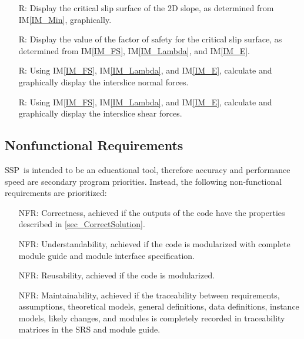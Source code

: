 \documentclass[12pt]{article}
\newcommand{\progname}{SSP}
\newcommand{\iref}[1]{IM\ref{#1}}
\newcounter{reqnum} %
\newcounter{nfreqnum} %
\begin{document}
\begin{itemize}
\item[R\refstepcounter{reqnum}\thereqnum \label{R_CritGraph}:] Display
  the critical slip surface of the 2D slope, as determined from \iref{IM_Min}, 
  graphically. 
  
\item[R\refstepcounter{reqnum}\thereqnum \label{R_OutputFS}:] Display the value 
of the factor of safety for the critical slip surface, as determined from 
\iref{IM_FS}, \iref{IM_Lambda}, and \iref{IM_E}.

\item[R\refstepcounter{reqnum}\thereqnum \label{R_NormalGraph}:] Using 
\iref{IM_FS}, \iref{IM_Lambda}, and \iref{IM_E}, calculate and 
graphically display the interslice normal forces.

\item[R\refstepcounter{reqnum}\thereqnum \label{R_ShearGraph}:] Using 
\iref{IM_FS}, \iref{IM_Lambda}, and \iref{IM_E}, calculate and 
graphically display the interslice shear forces.
  
\end{itemize}


\subsection{Nonfunctional Requirements}

\progname\ is intended to be an educational tool, therefore accuracy and
performance speed are secondary program priorities. Instead, the following 
non-functional requirements are prioritized:

\begin{itemize}
\item[NFR\refstepcounter{nfreqnum}\thenfreqnum \label{NFR_Correctness}:] 
Correctness, achieved if the outputs of the code have the properties described 
in \ref{sec_CorrectSolution}.
\item[NFR\refstepcounter{nfreqnum}\thenfreqnum \label{NFR_Understandability}:] 
Understandability, achieved if the code is modularized with 
complete module guide and module interface specification.
\item[NFR\refstepcounter{nfreqnum}\thenfreqnum \label{NFR_Reusability}:] 
Reusability, achieved if the code is modularized.
\item[NFR\refstepcounter{nfreqnum}\thenfreqnum \label{NFR_Maintainability}:] 
Maintainability, achieved if the traceability between 
requirements, assumptions, theoretical models, general definitions, data 
definitions, instance models, likely changes, and modules is completely 
recorded in traceability matrices in the SRS and module guide.
\end{itemize}
\end{document}
